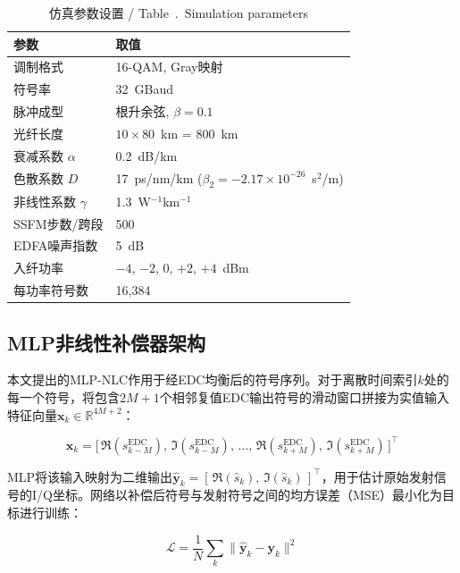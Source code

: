 \documentclass[conference]{IEEEtran}
\begin{document}
\begin{table}[h]
\centering
\caption{仿真参数设置 / Table~\thetable.~Simulation parameters}
\label{tab:params}
\begin{tabular}{@{}ll@{}}
\toprule
\textbf{参数} & \textbf{取值} \\
\midrule
调制格式     & 16-QAM, Gray映射 \\
符号率           & 32~GBaud \\
脉冲成型           & 根升余弦, $\beta = 0.1$ \\
光纤长度          & $10 \times 80$~km = 800~km \\
衰减系数 $\alpha$  & 0.2~dB/km \\
色散系数 $D$        & 17~ps/nm/km ($\beta_2 = -2.17 \times 10^{-26}$~s$^2$/m) \\
非线性系数 $\gamma$ & 1.3~W$^{-1}$km$^{-1}$ \\
SSFM步数/跨段       & 500 \\
EDFA噪声指数     & 5~dB \\
入纤功率         & $-4$, $-2$, 0, $+2$, $+4$~dBm \\
每功率符号数     & 16,384 \\
\bottomrule
\end{tabular}
\end{table}

\subsection{MLP非线性补偿器架构}

本文提出的MLP-NLC作用于经EDC均衡后的符号序列。对于离散时间索引$k$处的每一个符号，将包含$2M + 1$个相邻复值EDC输出符号的滑动窗口拼接为实值输入特征向量$\mathbf{x}_k \in \mathbb{R}^{4M + 2}$：

\begin{equation}
\mathbf{x}_k = \bigl[\,\Re(s_{k-M}^{\text{EDC}}),\,\Im(s_{k-M}^{\text{EDC}}),\,\dots,\,
\Re(s_{k+M}^{\text{EDC}}),\,\Im(s_{k+M}^{\text{EDC}})\,\bigr]^\top
\label{eq:features}
\end{equation}

MLP将该输入映射为二维输出$\hat{\mathbf{y}}_k = [\,\Re(\hat{s}_k),\,\Im(\hat{s}_k)\,]^\top$，用于估计原始发射信号的I/Q坐标。网络以补偿后符号与发射符号之间的均方误差（MSE）最小化为目标进行训练：

\begin{equation}
\mathcal{L} = \frac{1}{N}\sum_{k} \bigl\| \hat{\mathbf{y}}_k - \mathbf{y}_k \bigr\|^2
\label{eq:loss}
\end{equation}
\end{document}

